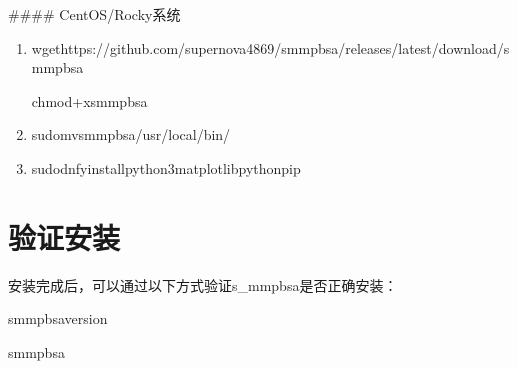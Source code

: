 \documentclass[letterpaper,10pt,english]{sphinxmanual}
\begin{document}
\sphinxAtStartPar
\#\#\#\# CentOS/Rocky系统
\begin{enumerate}
%
\item {} 
\sphinxAtStartPar
{}

\begin{sphinxVerbatim}[commandchars=\\\{\}]
wgethttps://github.com/supernova4869/s\PYGZus{}mmpbsa/releases/latest/download/s\PYGZus{}mmpbsa

chmod+xs\PYGZus{}mmpbsa
\end{sphinxVerbatim}

\item {} 
\sphinxAtStartPar
{}

\begin{sphinxVerbatim}[commandchars=\\\{\}]
sudomvs\PYGZus{}mmpbsa/usr/local/bin/
\end{sphinxVerbatim}

\item {} 
\sphinxAtStartPar
{}

\begin{sphinxVerbatim}[commandchars=\\\{\}]

sudodnf\PYGZhy{}yinstallpython3\PYGZhy{}matplotlibpython\PYGZhy{}pip
\end{sphinxVerbatim}

\end{enumerate}


\section{验证安装}
\label{\detokenize{installation:id5}}
\sphinxAtStartPar
安装完成后，可以通过以下方式验证s\_mmpbsa是否正确安装：

\begin{sphinxVerbatim}[commandchars=\\\{\}]
s\PYGZus{}mmpbsa\PYGZhy{}\PYGZhy{}version

s\PYGZus{}mmpbsa
\end{sphinxVerbatim}
\end{document}
